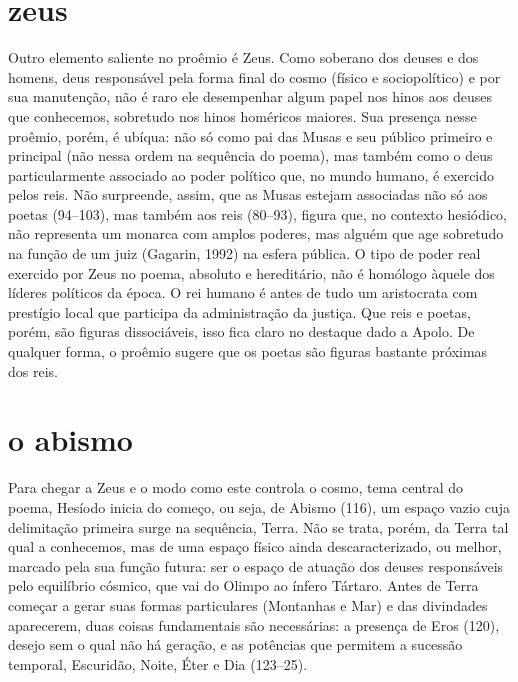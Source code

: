 \section{zeus}

Outro elemento saliente no proêmio é Zeus. Como soberano dos deuses e dos
homens, deus responsável pela forma final do cosmo  
(físico e sociopolítico) e por sua manutenção, não é
raro ele desempenhar algum papel nos hinos aos deuses que conhecemos, sobretudo
nos hinos homéricos maiores. Sua presença nesse proêmio, porém, é ubíqua: não
só como pai das Musas e seu público primeiro e principal (não nessa ordem na
sequência do poema), mas também como o deus particularmente associado ao poder
político que, no mundo humano, é exercido pelos reis. Não surpreende, assim,
que as Musas estejam associadas não só aos poetas
(94--103), mas também aos reis (80--93), figura que, no contexto hesiódico, não
representa um monarca com amplos poderes, mas alguém que age sobretudo na
função de um juiz (Gagarin, 1992) na esfera
pública. O tipo de poder real exercido por Zeus no poema, absoluto e
hereditário, não é homólogo àquele dos líderes políticos da época. O rei
humano é antes de tudo um aristocrata com prestígio local que participa da
administração da justiça. Que reis e poetas, porém, são figuras dissociáveis,
isso fica claro no destaque dado a Apolo. De qualquer forma, o proêmio sugere
que os poetas são figuras bastante próximas dos reis.

\section{o abismo}

Para chegar a Zeus e o modo como este controla o cosmo, tema central do poema,
Hesíodo inicia do começo, ou seja, de Abismo (116), um espaço vazio cuja
delimitação primeira surge na sequência, Terra. Não se trata, porém, da Terra
tal qual a conhecemos, mas de uma espaço físico ainda descaracterizado, ou
melhor, marcado pela sua função futura: ser o espaço de atuação dos deuses
responsáveis pelo equilíbrio cósmico, que vai do Olimpo ao ínfero Tártaro.
Antes de Terra começar a gerar suas formas particulares (Montanhas e Mar) e das
divindades aparecerem, duas coisas fundamentais são necessárias: a presença de
Eros (120), desejo sem o qual não há geração, e as potências que permitem a
sucessão temporal, Escuridão, Noite, Éter e Dia (123--25).

